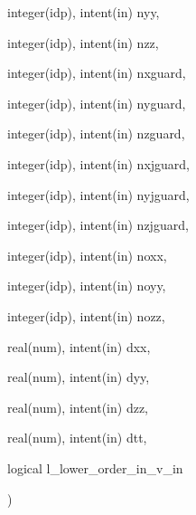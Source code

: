 {\begin{DoxyParamCaption}
\item[{integer(idp), intent(in)}]{nyy, }
\item[{integer(idp), intent(in)}]{nzz, }
\item[{integer(idp), intent(in)}]{nxguard, }
\item[{integer(idp), intent(in)}]{nyguard, }
\item[{integer(idp), intent(in)}]{nzguard, }
\item[{integer(idp), intent(in)}]{nxjguard, }
\item[{integer(idp), intent(in)}]{nyjguard, }
\item[{integer(idp), intent(in)}]{nzjguard, }
\item[{integer(idp), intent(in)}]{noxx, }
\item[{integer(idp), intent(in)}]{noyy, }
\item[{integer(idp), intent(in)}]{nozz, }
\item[{real(num), intent(in)}]{dxx, }
\item[{real(num), intent(in)}]{dyy, }
\item[{real(num), intent(in)}]{dzz, }
\item[{real(num), intent(in)}]{dtt, }
\item[{logical}]{l\+\_\+lower\+\_\+order\+\_\+in\+\_\+v\+\_\+in}
\end{DoxyParamCaption}
)}\hypertarget{field__gathering_8_f90_a3048fd8eb5e48d87fa67d382d260b22f}{}\label{field__gathering_8_f90_a3048fd8eb5e48d87fa67d382d260b22f}
